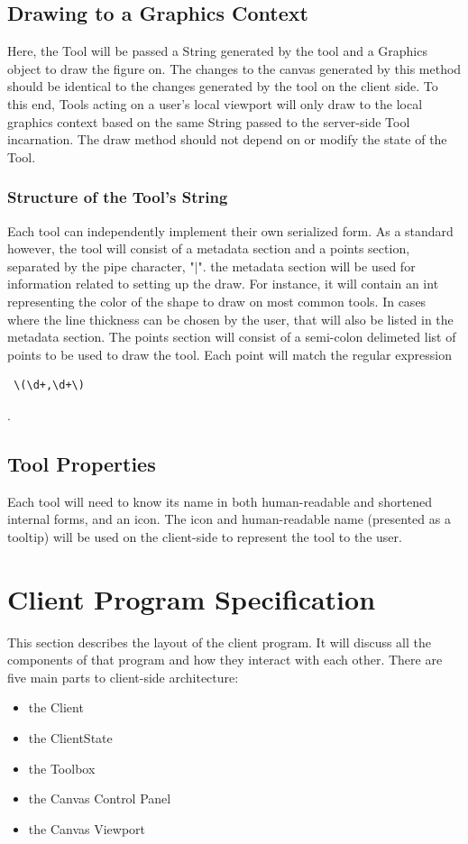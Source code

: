 \documentclass[11pt,oneside,a4paper]{article}
\begin{document}
 \subsection{Drawing to a Graphics Context}
  Here, the Tool will be passed a String generated by the tool and a Graphics
  object to draw the figure on. The changes to the canvas generated by this
  method should be identical to the changes generated by the tool on the client
  side. To this end, Tools acting on a user's local viewport will only draw to
  the local graphics context based on the same String passed to the server-side
  Tool incarnation. The draw method should not depend on or modify the state of
  the Tool.

 \subsubsection{Structure of the Tool's String}
 Each tool can independently implement their own serialized form. As a standard
 however, the tool will consist of a metadata section and a points section,
 separated by the pipe character, "$|$". the metadata section will be used for
 information related to setting up the draw. For instance, it will contain an
 int representing the color of the shape to draw on most common tools. In cases
 where the line thickness can be chosen by the user, that will also be listed
 in the metadata section. The points section will consist of a semi-colon
 delimeted list of points to be used to draw the tool. Each point will match
 the regular expression \begin{verbatim} \(\d+,\d+\) \end{verbatim}. 
 
 \subsection{Tool Properties}
  Each tool will need to know its name in both human-readable and shortened
  internal forms, and an icon. The icon and human-readable name (presented as a
  tooltip) will be used on the client-side to represent the tool to the user.

\section{Client Program Specification}
 This section describes the layout of the client program. It will discuss all
 the components of that program and how they interact with each other. There
 are five main parts to client-side architecture:
 \begin{itemize}
  \item the Client
  \item the ClientState
  \item the Toolbox
  \item the Canvas Control Panel
  \item the Canvas Viewport
 \end{itemize}
\end{document}
